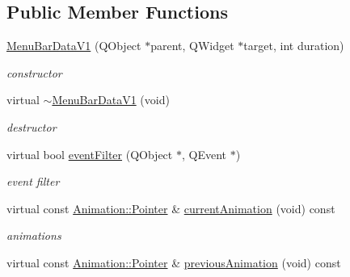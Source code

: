 \subsection*{Public Member Functions}
\begin{DoxyCompactItemize}
\item 
\mbox{\label{class_menu_bar_data_v1_a4b00509abf0ce9ac34e151dc9e107219}} 
\hyperlink{class_menu_bar_data_v1_a4b00509abf0ce9ac34e151dc9e107219}{Menu\+Bar\+Data\+V1} (Q\+Object $\ast$parent, Q\+Widget $\ast$target, int duration)
\begin{DoxyCompactList}\small\item\em constructor \end{DoxyCompactList}\item 
\mbox{\label{class_menu_bar_data_v1_a2fa658d8840483c4b016ff023affb892}} 
virtual \hyperlink{class_menu_bar_data_v1_a2fa658d8840483c4b016ff023affb892}{$\sim$\+Menu\+Bar\+Data\+V1} (void)
\begin{DoxyCompactList}\small\item\em destructor \end{DoxyCompactList}\item 
\mbox{\label{class_menu_bar_data_v1_a649937c01368091e4b3f1ecf35481f5b}} 
virtual bool \hyperlink{class_menu_bar_data_v1_a649937c01368091e4b3f1ecf35481f5b}{event\+Filter} (Q\+Object $\ast$, Q\+Event $\ast$)
\begin{DoxyCompactList}\small\item\em event filter \end{DoxyCompactList}\item 
\mbox{\label{class_menu_bar_data_v1_ac0f8ec659bab35fd2f2e0c214f4f7bed}} 
virtual const \hyperlink{class_animation_ac48a8d074abd43dc3f6485353ba24e30}{Animation\+::\+Pointer} \& \hyperlink{class_menu_bar_data_v1_ac0f8ec659bab35fd2f2e0c214f4f7bed}{current\+Animation} (void) const
\begin{DoxyCompactList}\small\item\em animations \end{DoxyCompactList}\item 
\mbox{\label{class_menu_bar_data_v1_a6fa7c35f259d7982724a7464936f0ac0}} 
virtual const \hyperlink{class_animation_ac48a8d074abd43dc3f6485353ba24e30}{Animation\+::\+Pointer} \& \hyperlink{class_menu_bar_data_v1_a6fa7c35f259d7982724a7464936f0ac0}{previous\+Animation} (void) const

\end{DoxyCompactItemize}
